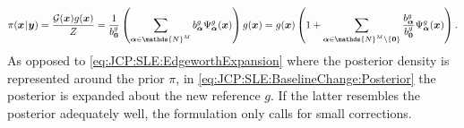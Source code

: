 \begin{equation} \label{eq:JCP:SLE:BaselineChange:Posterior}
  \pi(\bm{x} \cond \bm{y})
  = \frac{\auxQuantity(\bm{x}) \newBase(\bm{x})}{\scale}
  = \frac{1}{\coeffBaseL_{\bm{0}}} \left( \sum\limits_{\bm{\alpha} \in \mathds{N}^\dimParam} \coeffBaseL_{\bm{\alpha}} \basisBase_{\bm{\alpha}}(\bm{x}) \right) \newBase(\bm{x})
  = \newBase(\bm{x}) \left( 1 + \sum\limits_{\bm{\alpha} \in \mathds{N}^\dimParam \setminus \{\bm{0}\}} \frac{\coeffBaseL_{\bm{\alpha}}}{\coeffBaseL_{\bm{0}}} \basisBase_{\bm{\alpha}}(\bm{x}) \right).
\end{equation}
As opposed to \cref{eq:JCP:SLE:EdgeworthExpansion} where the posterior density is represented around the prior \(\pi\),
in \cref{eq:JCP:SLE:BaselineChange:Posterior} the posterior is expanded about the new reference \(g\).
If the latter resembles the posterior adequately well, the formulation only calls for small corrections.